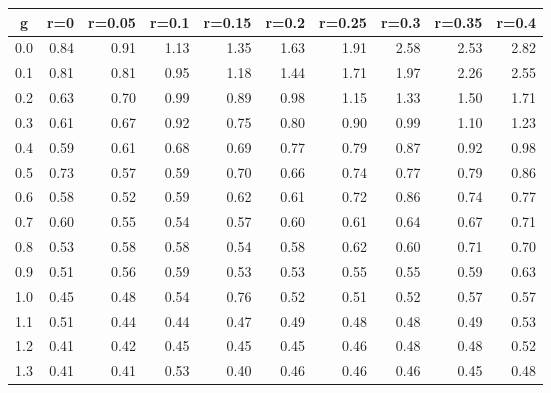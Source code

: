 %
\begin{table}[!tbp]
 \begin{center}
 \begin{tabular}{rrrrrrrrrr}\hline\hline
\multicolumn{1}{c}{g}&\multicolumn{1}{c}{r=0}&\multicolumn{1}{c}{r=0.05}&\multicolumn{1}{c}{r=0.1}&\multicolumn{1}{c}{r=0.15}&\multicolumn{1}{c}{r=0.2}&\multicolumn{1}{c}{r=0.25}&\multicolumn{1}{c}{r=0.3}&\multicolumn{1}{c}{r=0.35}&\multicolumn{1}{c}{r=0.4}\tabularnewline
\hline
0.0&0.84&0.91&1.13&1.35&1.63&1.91&2.58&2.53&2.82\tabularnewline
0.1&0.81&0.81&0.95&1.18&1.44&1.71&1.97&2.26&2.55\tabularnewline
0.2&0.63&0.70&0.99&0.89&0.98&1.15&1.33&1.50&1.71\tabularnewline
0.3&0.61&0.67&0.92&0.75&0.80&0.90&0.99&1.10&1.23\tabularnewline
0.4&0.59&0.61&0.68&0.69&0.77&0.79&0.87&0.92&0.98\tabularnewline
0.5&0.73&0.57&0.59&0.70&0.66&0.74&0.77&0.79&0.86\tabularnewline
0.6&0.58&0.52&0.59&0.62&0.61&0.72&0.86&0.74&0.77\tabularnewline
0.7&0.60&0.55&0.54&0.57&0.60&0.61&0.64&0.67&0.71\tabularnewline
0.8&0.53&0.58&0.58&0.54&0.58&0.62&0.60&0.71&0.70\tabularnewline
0.9&0.51&0.56&0.59&0.53&0.53&0.55&0.55&0.59&0.63\tabularnewline
1.0&0.45&0.48&0.54&0.76&0.52&0.51&0.52&0.57&0.57\tabularnewline
1.1&0.51&0.44&0.44&0.47&0.49&0.48&0.48&0.49&0.53\tabularnewline
1.2&0.41&0.42&0.45&0.45&0.45&0.46&0.48&0.48&0.52\tabularnewline
1.3&0.41&0.41&0.53&0.40&0.46&0.46&0.46&0.45&0.48\tabularnewline
\hline
\end{tabular}

\end{center}

\end{table}

